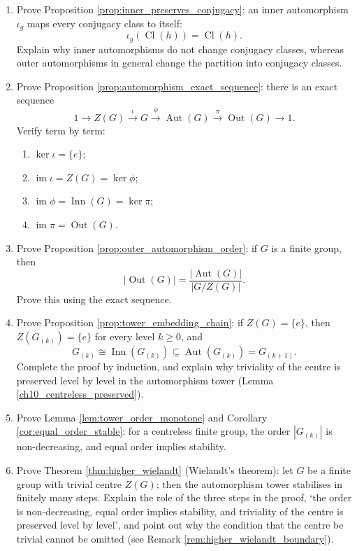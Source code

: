 \begin{enumerate}[leftmargin=3em, label=\textbf{Exercise \arabic*}]
    \item Prove Proposition \ref{prop:inner_preserves_conjugacy}:
    an inner automorphism $\iota_g$ maps every conjugacy class to itself:
    \[
    \iota_g(\operatorname{Cl}(h))=\operatorname{Cl}(h).
    \]
    Explain why inner automorphisms do not change conjugacy classes, whereas outer automorphisms in general change the partition into conjugacy classes.

    \item Prove Proposition \ref{prop:automorphism_exact_sequence}:
    there is an exact sequence
    \[
    1\to Z(G)\xrightarrow{\iota}G\xrightarrow{\phi}\operatorname{Aut}(G)
    \xrightarrow{\pi}\operatorname{Out}(G)\to 1.
    \]
    Verify term by term:
    \begin{enumerate}[label=(\roman*)]
        \item $\ker\iota=\{e\}$;
        \item $\operatorname{im}\iota=Z(G)=\ker\phi$;
        \item $\operatorname{im}\phi=\operatorname{Inn}(G)=\ker\pi$;
        \item $\operatorname{im}\pi=\operatorname{Out}(G)$.
    \end{enumerate}

    \item Prove Proposition \ref{prop:outer_automorphism_order}:
    if $G$ is a finite group, then
    \[
    |\operatorname{Out}(G)|=\frac{|\operatorname{Aut}(G)|}{|G/Z(G)|}.
    \]
    Prove this using the exact sequence.

    \item Prove Proposition \ref{prop:tower_embedding_chain}:
    if $Z(G)=\{e\}$, then $Z(G_{(k)})=\{e\}$ for every level $k\ge0$,
    and
    \[
    G_{(k)}\cong\operatorname{Inn}(G_{(k)})\subseteq
    \operatorname{Aut}(G_{(k)})=G_{(k+1)}.
    \]
    Complete the proof by induction,
    and explain why triviality of the centre is preserved level by level in the automorphism tower (Lemma \ref{ch10_centreless_preserved}).

    \item Prove Lemma \ref{lem:tower_order_monotone} and Corollary \ref{cor:equal_order_stable}:
    for a centreless finite group, the order $|G_{(k)}|$ is non-decreasing, and equal order implies stability.

    \item Prove Theorem \ref{thm:higher_wielandt} (Wielandt's theorem):
    let $G$ be a finite group with trivial centre $Z(G)$;
    then the automorphism tower stabilises in finitely many steps.
    Explain the role of the three steps in the proof, `the order is non-decreasing, equal order implies stability, and triviality of the centre is preserved level by level',
    and point out why the condition that the centre be trivial cannot be omitted (see Remark \ref{rem:higher_wielandt_boundary}).


\end{enumerate}
